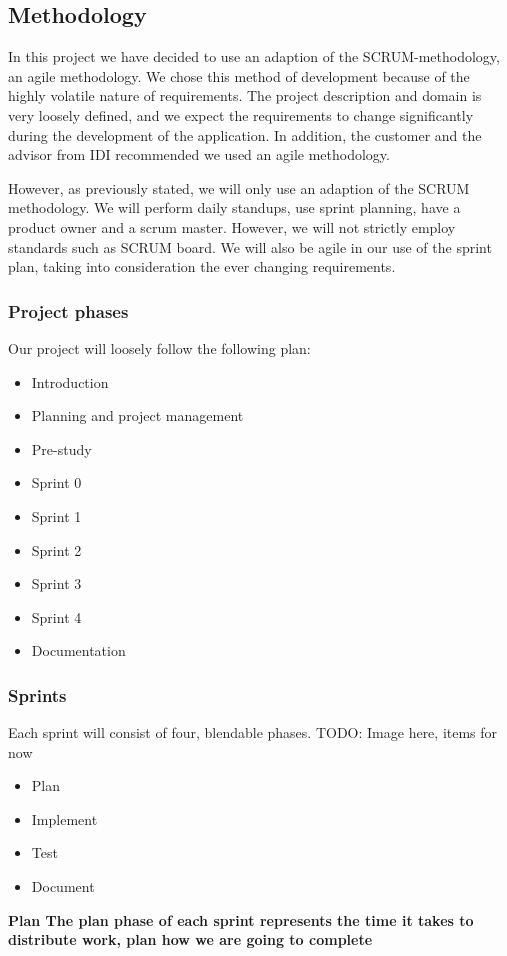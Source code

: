 \subsection{Methodology}
In this project we have decided to use an adaption of the SCRUM-methodology, an agile methodology. We chose this method of development because of the highly volatile nature of requirements. The project description and domain is very loosely defined, and we expect the requirements to change significantly during the development of the application. In addition, the customer and the advisor from IDI recommended we used an agile methodology.

However, as previously stated, we will only use an adaption of the SCRUM methodology. We will perform daily standups, use sprint planning, have a product owner and a scrum master. However, we will not strictly employ standards such as SCRUM board. We will also be agile in our use of the sprint plan, taking into consideration the ever changing requirements.

\subsubsection{Project phases}
Our project will loosely follow the following plan:
\begin{itemize}
  \item Introduction
  \item Planning and project management
  \item Pre-study
  \item Sprint 0
  \item Sprint 1
  \item Sprint 2
  \item Sprint 3
  \item Sprint 4
  \item Documentation
\end{itemize}

\subsubsection{Sprints}
Each sprint will consist of four, blendable phases.
TODO: Image here, items for now
\begin{itemize}
  \item Plan
  \item Implement
  \item Test
  \item Document
\end{itemize}

\bf{Plan} The plan phase of each sprint represents the time it takes to distribute work, plan how we are going to complete
